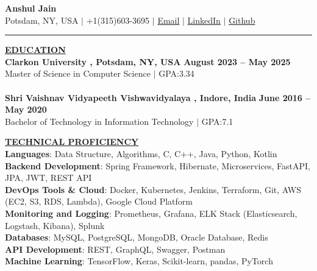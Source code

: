 \documentclass{article}
\begin{document}
\begin{center}
\thispagestyle{empty}
\large \textbf{\textbf{Anshul Jain}  \\}
\normalsize Potsdam, NY, USA $\mid$ +1(315)603-3695 $\mid$ \href{mailto:anshulj07@gmail.com}{Email} $\mid$ \href{https://www.linkedin.com/in/zanshul/}{LinkedIn} $\mid$  \href{https://github.com/anshulj07}{Github}  \\
\rule{\textwidth}{1pt}
\end{center}

\noindent \textbf{\underline{EDUCATION}} \\
\noindent \textbf{Clarkon University , Potsdam, NY, USA} \hfill \textbf{August 2023 – May 2025} \\
Master of Science in Computer Science $\mid$ GPA:3.34\\\\
\noindent \textbf{Shri Vaishnav Vidyapeeth Vishwavidyalaya , Indore, India}  \hfill \textbf{June 2016 – May 2020}  \\
Bachelor of Technology in Information Technology $\mid$ GPA:7.1

\vspace{2mm}

\noindent \textbf{\underline{TECHNICAL PROFICIENCY}} \\
\textbf{Languages}: Data Structure, Algorithms, C, C++, Java, Python, Kotlin\\
\textbf{Backend Development}: Spring Framework, Hibernate, Microservices, FastAPI, JPA, JWT, REST API\\
\textbf{DevOps Tools \& Cloud}: Docker, Kubernetes, Jenkins, Terraform, Git, AWS (EC2, S3, RDS, Lambda), Google Cloud Platform\\
\textbf{Monitoring and Logging}: Prometheus, Grafana, ELK Stack (Elasticsearch, Logstash, Kibana), Splunk\\
\textbf{Databases}: MySQL, PostgreSQL, MongoDB, Oracle Database, Redis\\
\textbf{API Development}: REST, GraphQL, Swagger, Postman\\
\textbf{Machine Learning}: TensorFlow, Keras, Scikit-learn, pandas, PyTorch
\vspace{2mm}
\end{document}
